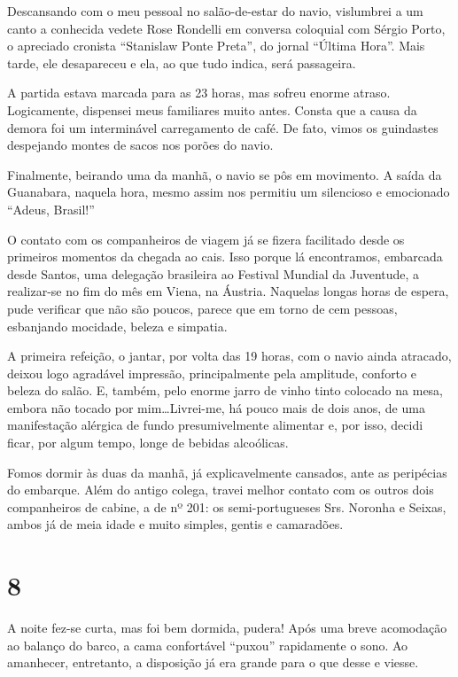 Descansando com o meu pessoal no salão-de-estar do navio, vislumbrei a um canto a conhecida vedete Rose Rondelli em conversa coloquial com Sérgio Porto, o apreciado cronista “Stanislaw Ponte Preta”, do jornal “Última Hora”. Mais tarde, ele desapareceu e ela, ao que tudo indica, será passageira.

A partida estava marcada para as 23 horas, mas sofreu enorme atraso. Logicamente, dispensei meus familiares muito antes. Consta que a causa da demora foi um interminável carregamento de café. De fato, vimos os guindastes despejando montes de sacos nos porões do navio.

Finalmente, beirando uma da manhã, o navio se pôs em movimento. A saída da Guanabara, naquela hora, mesmo assim nos permitiu um silencioso e emocionado “Adeus, Brasil!”

O contato com os companheiros de viagem já se fizera facilitado desde os primeiros momentos da chegada ao cais. Isso porque lá encontramos, embarcada desde Santos, uma delegação brasileira ao Festival Mundial da Juventude, a realizar-se no fim do mês em Viena, na Áustria. Naquelas longas horas de espera, pude verificar que não são poucos, parece que em torno de cem pessoas, esbanjando mocidade, beleza e simpatia.

A primeira refeição, o jantar, por volta das 19 horas, com o navio ainda atracado, deixou logo agradável impressão, principalmente pela amplitude, conforto e beleza do salão. E, também, pelo enorme jarro de vinho tinto colocado na mesa, embora não tocado por mim\ldots Livrei-me, há pouco mais de dois anos, de uma manifestação alérgica de fundo presumivelmente alimentar e, por isso, decidi ficar, por algum tempo, longe de bebidas alcoólicas.

Fomos dormir às duas da manhã, já explicavelmente cansados, ante as peripécias do embarque. Além do antigo colega, travei melhor contato com os outros dois companheiros de cabine, a de nº 201: os semi-portugueses Srs. Noronha e Seixas, ambos já de meia idade e muito simples, gentis e camaradões.

\section*{8 \adfflatleafright {}}
A noite fez-se curta, mas foi bem dormida, pudera! Após uma breve acomodação ao balanço do barco, a cama confortável “puxou” rapidamente o sono. Ao amanhecer, entretanto, a disposição já era grande para o que desse e viesse.

